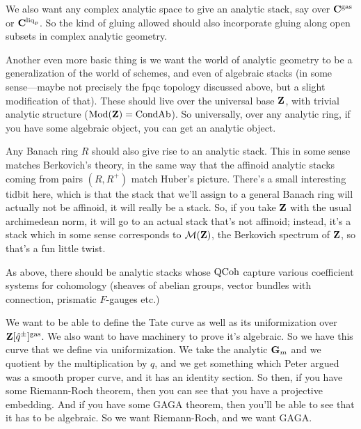 \begin{example}
  We also want any complex analytic space to give an analytic stack, say over $\mathbf C^{\mathrm{gas}}$ or $\mathbf C^{\mathrm{liq}_p}$. So the kind of gluing allowed should also incorporate gluing along open subsets in complex analytic geometry.
\end{example}

\begin{example}
  Another even more basic thing is we want the world of analytic geometry to be a generalization of the world of schemes, and even of algebraic stacks (in some sense---maybe not precisely the fpqc topology discussed above, but a slight modification of that). These should live over the universal base $\mathbf Z$, with trivial analytic structure ($\operatorname{Mod}(\mathbf Z)=\mathrm{Cond}\mathrm{Ab}$). So universally, over any analytic ring, if you have some algebraic object, you can get an analytic object.
\end{example}
  
\begin{example}
  Any Banach ring $R$ should also give rise to an analytic stack. This in some sense matches Berkovich's theory, in the same way that the affinoid analytic stacks coming from pairs $(R,R^+)$ match Huber's picture. There's a small interesting tidbit here, which is that the stack that we'll assign to a general Banach ring will actually not be affinoid, it will really be a stack. So, if you take $\mathbf Z$ with the usual archimedean norm, it will go to an actual stack that's not affinoid; instead, it's a stack which in some sense corresponds to $\mathcal M(\mathbf Z)$, the Berkovich spectrum of $\mathbf Z$, so that's a fun little twist.
\end{example}

\begin{example}
  As above, there should be analytic stacks whose $\operatorname{QCoh}$ capture various coefficient systems for cohomology (sheaves of abelian groups, vector bundles with connection, prismatic $F$-gauges etc.)
\end{example}

\begin{example}
  We want to be able to define the Tate curve as well as its uniformization over $\mathbf Z[\hat q^\pm]^{\mathrm{gas}}$. We also want to have machinery to prove it's algebraic. So we have this curve that we define via uniformization. We take the analytic $\mathbf G_m$ and we quotient by the multiplication by $q$, and we get something which Peter argued was a smooth proper curve, and it has an identity section. So then, if you have some Riemann-Roch theorem, then you can see that you have a projective embedding. And if you have some GAGA theorem, then you'll be able to see that it has to be algebraic. So we want Riemann-Roch, and we want GAGA.
\end{example}

